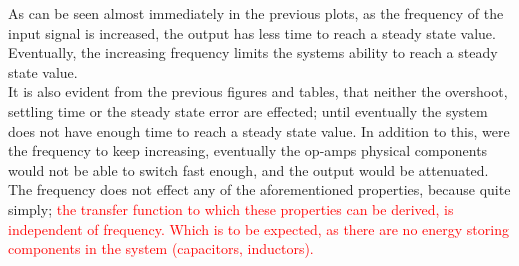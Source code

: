 \documentclass[11pt,a4paper]{article}
\begin{document}
\begin{enumerate}
	As can be seen almost immediately in the previous plots, as the frequency of the input signal is increased, the output has less time to reach a steady state value. %
	Eventually, the increasing frequency limits the systems ability to reach a steady state value.\\
	
	It is also evident from the previous figures and tables, that neither the overshoot, settling time or the steady state error are effected; until eventually the system does not have enough time to reach a steady state value. In addition to this, were the frequency to keep increasing, eventually the op-amps physical components would not be able to switch fast enough, and the output would be attenuated.\\
	
	The frequency does not effect any of the aforementioned properties, because quite simply; \textcolor{red}{the transfer function to which these properties can be derived, is independent of frequency. Which is to be expected, as there are no energy storing components in the system (capacitors, inductors).} 

	
	
	
	
	
	
	
	
	
	

\end{enumerate}
\end{document}
